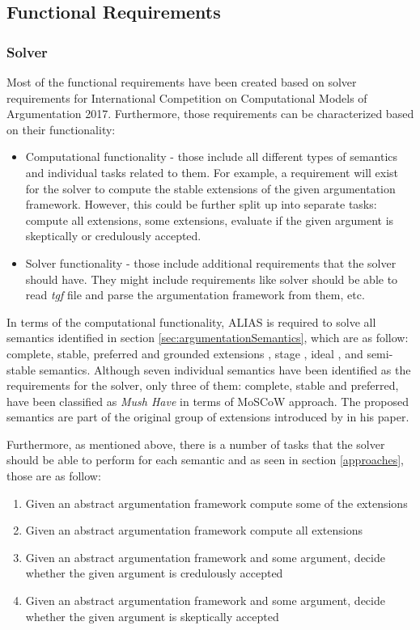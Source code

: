 \subsection{Functional Requirements}

\subsubsection{Solver}

Most of the functional requirements have been created based on solver requirements for International Competition on Computational Models of Argumentation 2017. Furthermore, those requirements can be characterized based on their functionality:
\begin{itemize}
	\item Computational functionality - those include all different types of semantics and individual tasks related to them. For example, a requirement will exist for the solver to compute the stable extensions of the given argumentation framework. However, this could be further split up into separate tasks: compute all extensions, some extensions, evaluate if the given argument is skeptically or credulously accepted.
	\item Solver functionality - those include additional requirements that the solver should have. They might include requirements like solver should be able to read \textit{tgf} file and parse the argumentation framework from them, etc.
\end{itemize}

In terms of the computational functionality, ALIAS is required to solve all semantics identified in section \ref{sec:argumentationSemantics}, which are as follow: complete, stable, preferred and grounded extensions \citep{dung1995}, stage \citep{verheij1996two}, ideal \citep{dung2007computing}, and semi-stable \citep{caminada2006semi} semantics. Although seven individual semantics have been identified as the requirements for the solver, only three of them: complete, stable and preferred, have been classified as \textit{Mush Have} in terms of MoSCoW approach. The proposed semantics are part of the original group of extensions introduced by \citet{dung1995} in his paper. 

Furthermore, as mentioned above, there is a number of tasks that the solver should be able to perform for each semantic and as seen in section \ref{approaches}, those are as follow:
\begin{enumerate}
	\item Given an abstract argumentation framework compute some of the extensions
	\item Given an abstract argumentation framework compute all extensions
	\item Given an abstract argumentation framework and some argument, decide whether the given argument is credulously accepted
	\item Given an abstract argumentation framework and some argument, decide whether the given argument is skeptically accepted
\end{enumerate}

